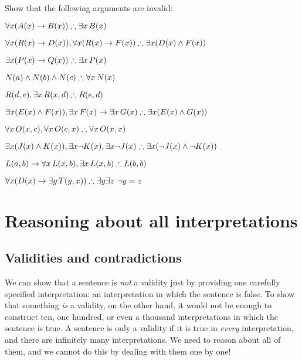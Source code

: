 \problempart
Show that the following arguments are invalid:
\begin{earg}
\item $\forall x(\atom{A}{x} \eif \atom{B}{x}) \therefore \exists x\, \atom{B}{x}$
\item $\forall x(\atom{R}{x} \eif \atom{D}{x}), \forall x(\atom{R}{x} \eif \atom{F}{x}) \therefore \exists x(\atom{D}{x} \eand \atom{F}{x})$
\item $\exists x(\atom{P}{x}\eif \atom{Q}{x}) \therefore \exists x\, \atom{P}{x}$
\item $\atom{N}{a} \eand \atom{N}{b} \eand \atom{N}{c} \therefore \forall x\, \atom{N}{x}$
\item $\atom{R}{d,e}, \exists x\, \atom{R}{x,d} \therefore \atom{R}{e,d}$
\item $\exists x(\atom{E}{x} \eand \atom{F}{x}), \exists x\, \atom{F}{x} \eif \exists x\, \atom{G}{x} \therefore \exists x(\atom{E}{x} \eand \atom{G}{x})$
\item $\forall x\, \atom{O}{x,c}, \forall x\, \atom{O}{c,x} \therefore \forall x\, \atom{O}{x,x}$
\item $\exists x(\atom{J}{x} \eand \atom{K}{x}), \exists x \enot \atom{K}{x}, \exists x \enot \atom{J}{x} \therefore \exists x(\enot \atom{J}{x} \eand \enot \atom{K}{x})$
\item $\atom{L}{a,b} \eif \forall x\, \atom{L}{x,b}, \exists x\, \atom{L}{x,b} \therefore \atom{L}{b,b}$
\item $\forall x(\atom{D}{x} \eif \exists y\, \atom{T}{y,x}) \therefore \exists y \exists z\ \enot y= z$
\end{earg}

\chapter[Reasoning about interpretations]{Reasoning about all interpretations}

\section{Validities and contradictions}
We can show that a sentence is \emph{not} a validity just by providing one carefully specified interpretation: an interpretation in which the sentence is false. To show that something \emph{is} a validity, on the other hand, it would not be enough to construct ten, one hundred, or even a thousand interpretations in which the sentence is true. A sentence is only a validity if it is true in \emph{every} interpretation, and there are infinitely many interpretations. We need to reason about all of them, and we cannot do this by dealing with them one by one!

